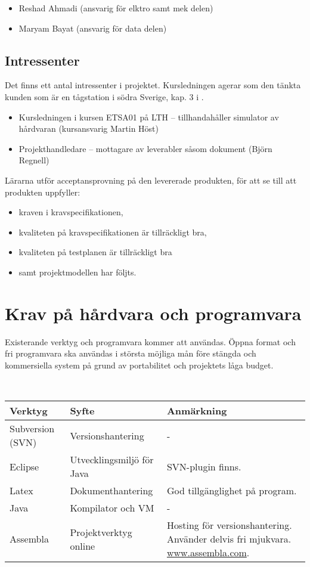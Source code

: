\documentclass[a4paper]{article}
\begin{document}
\begin{itemize}
\item Reshad Ahmadi (ansvarig för elktro samt mek delen)
\item Maryam Bayat (ansvarig för data delen)

\end{itemize}


\subsection{Intressenter} %
Det finns ett antal intressenter i projektet. Kursledningen agerar som den tänkta kunden som är en tågstation i södra Sverige, kap. 3 i \cite{engproc}.

\begin{itemize}
\item Kursledningen i kursen ETSA01 på LTH -- tillhandahåller simulator av hårdvaran (kursansvarig Martin Höst)
\item Projekthandledare -- mottagare av leverabler såsom dokument (Björn Regnell)
\end{itemize}

Lärarna utför acceptansprovning på den levererade produkten, för att se till att produkten uppfyller:

\begin{itemize}
\item kraven i kravspecifikationen,
\item kvaliteten på kravspecifikationen är tillräckligt bra,
\item kvaliteten på testplanen är tillräckligt bra
\item samt projektmodellen har följts.
\end{itemize}

\section{Krav på hårdvara och programvara} %
Existerande verktyg och programvara kommer att användas. Öppna format och fri programvara ska användas i största möjliga mån före stängda och kommersiella system på grund av portabilitet och projektets låga budget.

\ \\

\begin{tabular}{l|l|p{3.5cm}}
\textbf{Verktyg}		&	\textbf{Syfte}	&	\textbf{Anmärkning} \\
\hline
Subversion (SVN)		 &	 Versionshantering 	&	 - \\
Eclipse		 &	 Utvecklingsmiljö för Java	 &	 SVN-plugin finns. \\
Latex 	&	 Dokumenthantering	 &	 God tillgänglighet på program. \\
Java		 &	 Kompilator och VM 	&	 - \\
Assembla		 &	 Projektverktyg online	 & 		Hosting för versionshantering. Använder delvis fri mjukvara. \url{www.assembla.com}. \\
\end{tabular}
\end{document}
